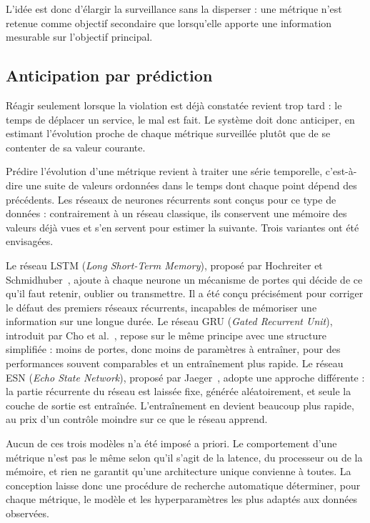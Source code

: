 L'idée est donc d'élargir la surveillance sans la disperser : une métrique n'est retenue comme objectif secondaire que lorsqu'elle apporte une information mesurable sur l'objectif principal.

\subsection{Anticipation par prédiction}

Réagir seulement lorsque la violation est déjà constatée revient trop tard : le temps de déplacer un service, le mal est fait. Le système doit donc anticiper, en estimant l'évolution proche de chaque métrique surveillée plutôt que de se contenter de sa valeur courante.

Prédire l'évolution d'une métrique revient à traiter une série temporelle, c'est-à-dire une suite de valeurs ordonnées dans le temps dont chaque point dépend des précédents. Les réseaux de neurones récurrents sont conçus pour ce type de données : contrairement à un réseau classique, ils conservent une mémoire des valeurs déjà vues et s'en servent pour estimer la suivante. Trois variantes ont été envisagées.

Le réseau LSTM (\emph{Long Short-Term Memory}), proposé par Hochreiter et Schmidhuber~\cite{hochreiter1997lstm}, ajoute à chaque neurone un mécanisme de portes qui décide de ce qu'il faut retenir, oublier ou transmettre. Il a été conçu précisément pour corriger le défaut des premiers réseaux récurrents, incapables de mémoriser une information sur une longue durée. Le réseau GRU (\emph{Gated Recurrent Unit}), introduit par Cho et al.~\cite{cho2014gru}, repose sur le même principe avec une structure simplifiée : moins de portes, donc moins de paramètres à entraîner, pour des performances souvent comparables et un entraînement plus rapide. Le réseau ESN (\emph{Echo State Network}), proposé par Jaeger~\cite{jaeger2001esn}, adopte une approche différente : la partie récurrente du réseau est laissée fixe, générée aléatoirement, et seule la couche de sortie est entraînée. L'entraînement en devient beaucoup plus rapide, au prix d'un contrôle moindre sur ce que le réseau apprend.

Aucun de ces trois modèles n'a été imposé a priori. Le comportement d'une métrique n'est pas le même selon qu'il s'agit de la latence, du processeur ou de la mémoire, et rien ne garantit qu'une architecture unique convienne à toutes. La conception laisse donc une procédure de recherche automatique déterminer, pour chaque métrique, le modèle et les hyperparamètres les plus adaptés aux données observées.

